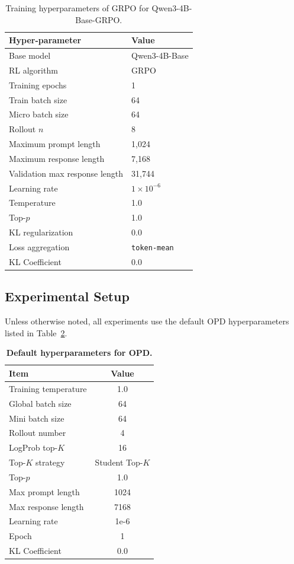 \begin{table}[!h]
\centering
\caption{Training hyperparameters of GRPO for Qwen3-4B-Base-GRPO.}
\label{tab:grpo_hparams}
\begin{tabular}{ll}
\toprule
\textbf{Hyper-parameter} & \textbf{Value} \\
\midrule
Base model & Qwen3-4B-Base \\
RL algorithm & GRPO \\
Training epochs & 1 \\
Train batch size & 64 \\
Micro batch size & 64 \\
Rollout $n$ & 8 \\
Maximum prompt length & 1,024 \\
Maximum response length & 7,168 \\
Validation max response length & 31,744 \\
Learning rate & $1 \times 10^{-6}$ \\
Temperature & 1.0 \\
Top-$p$ & 1.0 \\
KL regularization & 0.0 \\
Loss aggregation & \texttt{token-mean} \\
KL Coefficient & 0.0\\
\bottomrule
\end{tabular}
\end{table}

\subsection{Experimental Setup}
\label{app:experimental_setup}

Unless otherwise noted, all experiments use the default OPD hyperparameters listed in Table~\ref{tab:train_hparams_script}.

\begin{table}[t]
\centering
\caption{\textbf{Default hyperparameters for OPD.}}
\label{tab:train_hparams_script}

\begin{tabular}{lc}
\toprule
\textbf{Item} & \textbf{Value} \\
\midrule
Training temperature & 1.0 \\
Global batch size & 64 \\
Mini batch size & 64 \\
Rollout number & 4 \\
LogProb top-$K$ & 16 \\
Top-$K$ strategy & Student Top-$K$ \\
Top-$p$ & 1.0 \\
Max prompt length & 1024 \\
Max response length & 7168 \\
Learning rate & 1e-6 \\
Epoch & 1 \\
KL Coefficient & 0.0\\
\bottomrule
\end{tabular}
\end{table}

